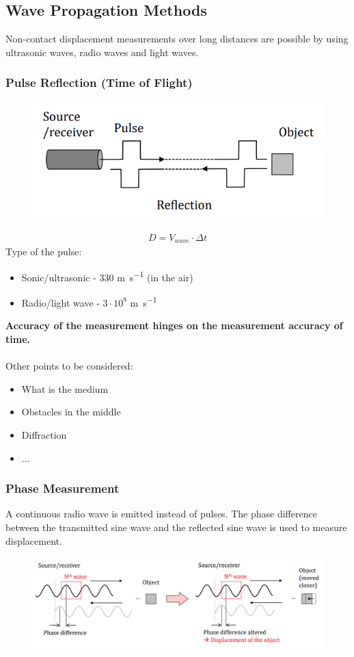 \documentclass[class=report, crop=false, 12pt,a4paper]{standalone}
\begin{document}
\subsection{Wave Propagation Methods}
Non-contact displacement measurements over long distances are possible by using ultrasonic waves, radio waves and light waves.
\subsubsection{Pulse Reflection (Time of Flight)}
\begin{figure}[H]
  \centering
  \includegraphics[width = 0.75 \textwidth]{../img/Mdiagram19.PNG}
\end{figure}
\begin{gather}
  D = V_{wave} \cdot \Delta t
\end{gather}
Type of the pulse:
\begin{itemize}
  \item Sonic/ultrasonic - $330$ \si{\metre\per\second} (in the air)
  \item Radio/light wave - $3\cdot 10^8$ \si{\metre\per\second}
\end{itemize}
\textbf{Accuracy of the measurement hinges on the measurement accuracy of time.} \\\\
Other points to be considered:
\begin{itemize}
  \item What is the medium
  \item Obstacles in the middle
  \item Diffraction
  \item ...
\end{itemize}
\subsubsection{Phase Measurement}
A continuous radio wave is emitted instead of pulses. The phase difference between the transmitted sine wave and the reflected sine wave is used to measure displacement.
\begin{figure}[H]
  \centering
  \includegraphics[width = 1 \textwidth]{../img/Mdiagram20.PNG}
\end{figure}
\end{document}
